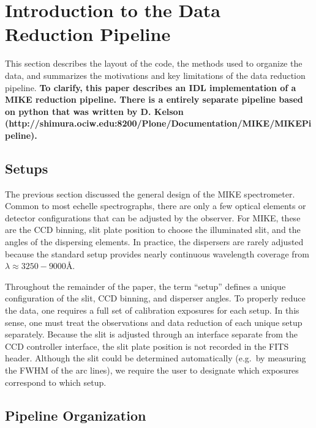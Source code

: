 \documentclass[12pt,preprint]{aastex}
\begin{document}

\section{Introduction to the Data Reduction Pipeline}
\label{sec:pipe}

This section describes the layout of the code, the methods
used to organize the data, and summarizes the motivations and 
key limitations of the data reduction pipeline.
{\bf To clarify, this paper describes an IDL implementation of
a MIKE reduction pipeline.  There is a entirely separate pipeline
based on python that was written by D. Kelson 
(http://shimura.ociw.edu:8200/Plone/Documentation/MIKE/MIKEPipeline).}

\subsection{Setups}

The previous section discussed the general design of the
MIKE spectrometer.  Common to most echelle spectrographs,
there are only a few optical elements or detector configurations
that can be adjusted by the observer.  For MIKE, these are the
CCD binning, slit plate position to choose the illuminated slit, 
and the angles of the dispersing elements.
In practice, the dispersers are rarely adjusted
because the standard setup provides nearly continuous wavelength
coverage from $\lambda \approx 3250-9000$\AA.  

Throughout the remainder of the paper, the term ``setup'' defines
a unique configuration of the slit, CCD binning,
and disperser angles.  To properly reduce the data, one requires
a full set of calibration exposures for each setup.  
In this sense, one must treat the observations and data reduction of
each unique setup separately. 
Because the slit is adjusted through an interface separate from the CCD
controller interface, the slit plate position is not
recorded in the FITS header.  Although the slit could be
determined automatically (e.g.\ by measuring the FWHM of the arc lines),
we require the user to designate 
which exposures correspond to which setup.

\subsection{Pipeline Organization}
 
\end{document}
